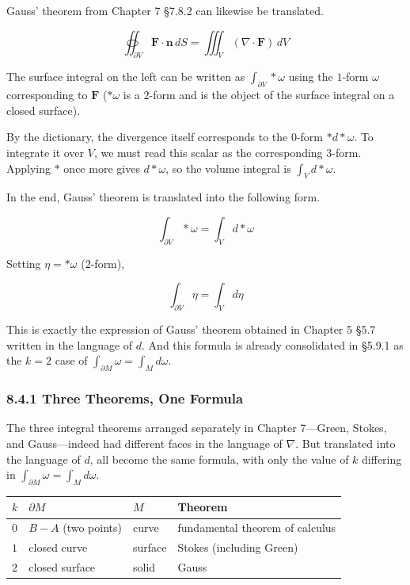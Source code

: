 Gauss' theorem from Chapter 7 §7.8.2 can likewise be translated.

\[\oiint_{\partial V} \mathbf{F} \cdot \mathbf{n}\,dS = \iiint_V (\nabla \cdot \mathbf{F})\,dV\]

The surface integral on the left can be written as
\(\int_{\partial V} \ast\omega\) using the \(1\)-form \(\omega\)
corresponding to \(\mathbf{F}\) (\(\ast\omega\) is a \(2\)-form and is
the object of the surface integral on a closed surface).

By the dictionary, the divergence itself corresponds to the \(0\)-form
\(\ast d\ast\omega\). To integrate it over \(V\), we must read this
scalar as the corresponding \(3\)-form. Applying \(\ast\) once more
gives \(d\ast\omega\), so the volume integral is \(\int_V d\ast\omega\).

In the end, Gauss' theorem is translated into the following form.

\[\int_{\partial V} \ast\omega = \int_V d\ast\omega\]

Setting \(\eta = \ast\omega\) (\(2\)-form),

\[\int_{\partial V} \eta = \int_V d\eta\]

This is exactly the expression of Gauss' theorem obtained in Chapter 5
§5.7 written in the language of \(d\). And this formula is already
consolidated in §5.9.1 as the \(k=2\) case of
\(\int_{\partial M}\omega = \int_M d\omega\).

\hypertarget{three-theorems-one-formula}{%
\subsubsection{8.4.1 Three Theorems, One
Formula}\label{three-theorems-one-formula}}

The three integral theorems arranged separately in Chapter 7---Green,
Stokes, and Gauss---indeed had different faces in the language of
\(\nabla\). But translated into the language of \(d\), all become the
same formula, with only the value of \(k\) differing in
\(\int_{\partial M}\omega = \int_M d\omega\).

\begin{longtable}[]{@{}llll@{}}
\toprule\noalign{}
\(k\) & \(\partial M\) & \(M\) & Theorem \\
\midrule\noalign{}
\endhead
\bottomrule\noalign{}
\endlastfoot
\(0\) & \(B-A\) (two points) & curve & fundamental theorem of
calculus \\
\(1\) & closed curve & surface & Stokes (including Green) \\
\(2\) & closed surface & solid & Gauss \\
\end{longtable}


